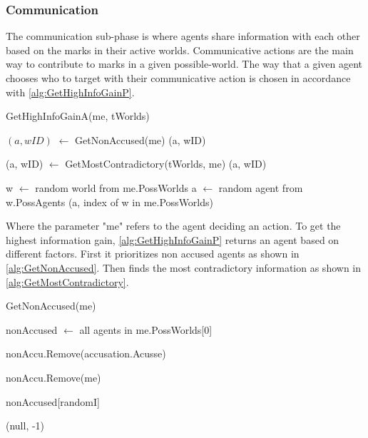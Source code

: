 \subsubsection{Communication}\label{sec:communication}
The communication sub-phase is where agents share information with each other
based on the marks in their active worlds. Communicative actions are
the main way to contribute to marks in a given possible-world. The way that a
given agent chooses who to target with their communicative action is chosen in
accordance with \cref{alg:GetHighInfoGainP}.
\begin{algorithm}[H]
	\caption{GetHighInfoGainA(me, tWorlds)}
	\begin{algorithmic}
		\State $(a, wID)$ $\gets$ GetNonAccused(me)
		\State \Return (a, wID)
		\EndIf
		\EndIf

		\State (a, wID) $\gets$ GetMostContradictory(tWorlds, me)
		\State \Return (a, wID)
		\EndIf

		\State w $\gets$ random world from me.PossWorlds \State
		a $\gets$ random agent from w.PossAgents \State \Return (a, index of w in
		me.PossWorlds)
	\end{algorithmic}\label{alg:GetHighInfoGainP}
\end{algorithm}
\setcounter{algorithmcaption}{2}
Where the parameter "me" refers to the agent deciding an action. To get the highest information gain, \cref{alg:GetHighInfoGainP} returns an
agent based on different factors.
First it prioritizes non accused agents as shown in
\cref{alg:GetNonAccused}.
Then finds the most contradictory information as shown in
\cref{alg:GetMostContradictory}. \\
\begin{algorithm}[H]
	\caption{GetNonAccused(me)}
	\begin{algorithmic}
		\State nonAccused $\gets$ all agents in me.PossWorlds[0]
		\EndIf

		\State nonAccu.Remove(accusation.Acusse)
		\EndFor

		\State nonAccu.Remove(me)

		\State \Return nonAccused[randomI]
		\EndIf

		\State \Return (null, -1)
	\end{algorithmic}\label{alg:GetNonAccused}
\end{algorithm}
